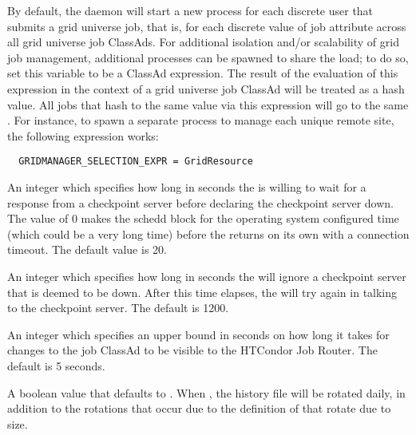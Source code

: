 \begin{description}
\label{param:GridManagerSelectionExpr}
\item[\Macro{GRIDMANAGER\_SELECTION\_EXPR}]
  By default, the  daemon will start a new 
   process for each
  discrete user that submits a grid universe job,
  that is, for each discrete value of job attribute  across
  all grid universe job ClassAds.
  For additional isolation and/or scalability of grid job management,
  additional  processes can be spawned to share the load;
  to do so, set this variable to be a ClassAd expression.
  The result of the evaluation of this expression in the
  context of a grid universe job ClassAd will be treated as a hash value.
  All jobs that hash to the same value via this expression will go to the
  same .
  For instance, to spawn a separate  process to
  manage each unique remote site, the following expression works:
\begin{verbatim}
  GRIDMANAGER_SELECTION_EXPR = GridResource 
\end{verbatim}

\label{param:CkptServerClientTimeout}
\item[\Macro{CKPT\_SERVER\_CLIENT\_TIMEOUT}]
  An integer which specifies how long in seconds the  is
  willing to wait for a response from a checkpoint server before declaring
  the checkpoint server down. The value of 0 makes the schedd block for
  the operating system configured time (which could be a very long time)
  before the  returns on its own with a connection timeout.
  The default value is 20.

\label{param:CkptServerClientTimeoutRetry}
\item[\Macro{CKPT\_SERVER\_CLIENT\_TIMEOUT\_RETRY}]
  An integer which specifies how long in seconds the  will
  ignore a checkpoint server that is deemed to be down. After this time
  elapses, the  will try again in talking to the checkpoint
  server.
  The default is 1200.

\label{param:ScheddJobQueueLogFlushDelay}
\item[\Macro{SCHEDD\_JOB\_QUEUE\_LOG\_FLUSH\_DELAY}]
  An integer which specifies an upper bound in seconds on how long it
  takes for changes to the job ClassAd to be visible to the HTCondor Job Router.
  The default is 5 seconds.

\label{param:RotateHistoryDaily}
\item[\Macro{ROTATE\_HISTORY\_DAILY}]
  A boolean value that defaults to .
  When , the history file will be rotated daily,
  in addition to the rotations that occur due to the definition of  
   that rotate due to size.


\end{description}

